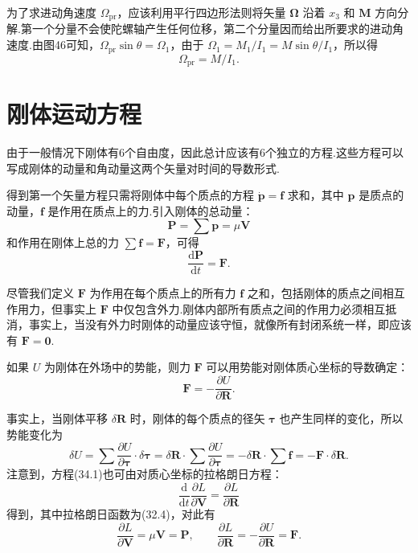 为了求进动角速度 $\Omega_{\mathrm{pr}}$，应该利用平行四边形法则将矢量 $\boldsymbol{\Omega}$ 沿着 $x_3$ 和 $\boldsymbol{M}$ 方向分解.第一个分量不会使陀螺轴产生任何位移，第二个分量因而给出所要求的进动角速度.由图46可知，$\Omega_{\mathrm{pr}}\sin\theta=\Omega_1$，由于 $\Omega_1=M_1/I_1=M\sin\theta/I_1$，所以得
\begin{equation}
  \Omega_{\mathrm{pr}}=M/I_1.
\end{equation}

\section{刚体运动方程}

由于一般情况下刚体有6个自由度，因此总计应该有6个独立的方程.这些方程可以写成刚体的动量和角动量这两个矢量对时间的导数形式.

得到第一个矢量方程只需将刚体中每个质点的方程 $\dot{\boldsymbol{p}}=\boldsymbol{f}$ 求和，其中 $\boldsymbol{p}$ 是质点的动量，$\boldsymbol{f}$ 是作用在质点上的力.引入刚体的总动量：
\begin{equation*}
  \boldsymbol{P}=\sum\boldsymbol{p}=\mu\boldsymbol{V}
\end{equation*}
和作用在刚体上总的力 $\sum\boldsymbol{f}=\boldsymbol{F}$，可得
\begin{equation}
  \frac{\mathrm{d}\boldsymbol{P}}{\mathrm{d}t}=\boldsymbol{F}.
\end{equation}

尽管我们定义 $\boldsymbol{F}$ 为作用在每个质点上的所有力 $\boldsymbol{f}$ 之和，包括刚体的质点之间相互作用力，但事实上 $\boldsymbol{F}$ 中仅包含外力.刚体内部所有质点之间的作用力必须相互抵消，事实上，当没有外力时刚体的动量应该守恒，就像所有封闭系统一样，即应该有 $\boldsymbol{F}=\boldsymbol{0}$.

如果 $U$ 为刚体在外场中的势能，则力 $\boldsymbol{F}$ 可以用势能对刚体质心坐标的导数确定：
\begin{equation}
  \boldsymbol{F}=-\frac{\partial U}{\partial\boldsymbol{R}}.
\end{equation}

事实上，当刚体平移 $\delta\boldsymbol{R}$ 时，刚体的每个质点的径矢 $\boldsymbol{\tau}$ 也产生同样的变化，所以势能变化为
\begin{equation*}
  \delta U=\sum\frac{\partial U}{\partial\boldsymbol{\tau}}\cdot\delta\boldsymbol{\tau}
  =\delta\boldsymbol{R}\cdot\sum\frac{\partial U}{\partial\boldsymbol{\tau}}
  =-\delta\boldsymbol{R}\cdot\sum\boldsymbol{f}
  =-\boldsymbol{F}\cdot\delta\boldsymbol{R}.
\end{equation*}
注意到，方程(34.1)也可由对质心坐标的拉格朗日方程：
\begin{equation*}
  \frac{\mathrm{d}}{\mathrm{d}t}\frac{\partial L}{\partial\boldsymbol{V}}
  =\frac{\partial L}{\partial\boldsymbol{R}}
\end{equation*}
得到，其中拉格朗日函数为(32.4)，对此有
\begin{equation*}
  \frac{\partial L}{\partial\boldsymbol{V}}=\mu\boldsymbol{V}=\boldsymbol{P},
  \qquad
  \frac{\partial L}{\partial\boldsymbol{R}}
  =-\frac{\partial U}{\partial\boldsymbol{R}}=\boldsymbol{F}.
\end{equation*}

